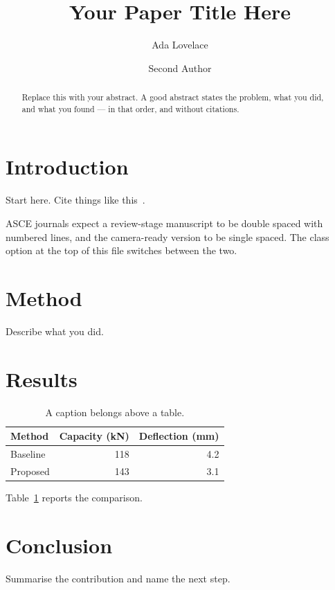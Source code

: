 \documentclass[Review]{ascelike}
\begin{document}
\title{Your Paper Title Here}

\author[1]{Ada Lovelace}
\author[2]{Second Author}

\maketitle

\begin{abstract}
Replace this with your abstract. A good abstract states the problem, what you
did, and what you found --- in that order, and without citations.
\end{abstract}


\section{Introduction}
Start here. Cite things like this~\cite{knuth1984texbook}.

ASCE journals expect a review-stage manuscript to be double spaced with
numbered lines, and the camera-ready version to be single spaced. The class
option at the top of this file switches between the two.

\section{Method}
Describe what you did.

\section{Results}

\begin{table}
\caption{A caption belongs above a table.}
\label{tab:results}
\centering
\begin{tabular}{lrr}
\hline
Method & Capacity (kN) & Deflection (mm)\\
\hline
Baseline & 118 & 4.2\\
Proposed & 143 & 3.1\\
\hline
\end{tabular}
\end{table}

Table~\ref{tab:results} reports the comparison.

\section{Conclusion}
Summarise the contribution and name the next step.



\end{document}
